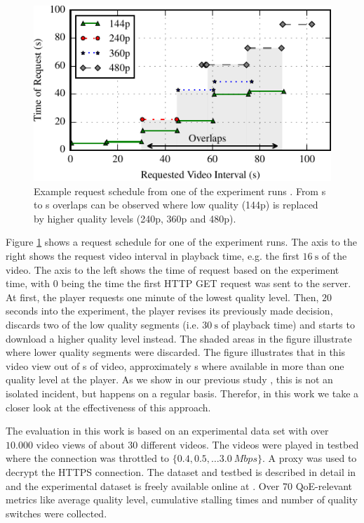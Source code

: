 \begin{figure}[t]
\centering
\includegraphics[width=\columnwidth]{figs/eg_request_schedule}%
\caption{Example request schedule from one of the experiment runs \cite{sieber16sacrificing}. From \unit[30]{s} to \unit[90]{s} overlaps can be observed where low quality (144p) is replaced by higher quality levels (240p, 360p and 480p).}
\label{fig:request_schedule}%
\end{figure}

Figure \ref{fig:request_schedule} shows a request schedule for one of the experiment runs.
The axis to the right shows the request video interval in playback time, e.g. the first $\SI{16}{\second}$ of the video.
The axis to the left shows the time of request based on the experiment time, with $0$ being the time the first HTTP GET request was sent to the server.
At first, the player requests one minute of the lowest quality level.
Then, ${20}$ seconds into the experiment, the player revises its previously made decision, discards two of the low quality segments (i.e. $\SI{30}{\second}$ of playback time) and starts to download a higher quality level instead.
The shaded areas in the figure illustrate where lower quality segments were discarded.
The figure illustrates that in this video view out of \unit[105]{s} of video, approximately \unit[60]{s} where available in more than one quality level at the player. 
As we show in our previous study \cite{sieber16sacrificing}, this is not an isolated incident, but happens on a regular basis. 
Therefor, in this work we take a closer look at the effectiveness of this approach.

The evaluation in this work is based on an experimental data set with over $10.000$ video views of about $30$ different videos.
The videos were played in testbed where the connection was throttled to $\{0.4, 0.5, \dots \SI{3.0}{Mbps}\}$.
A proxy was used to decrypt the HTTPS connection.
The dataset and testbed is described in detail in \cite{sieber16sacrificing,sieber15costaggressive} and the experimental dataset is freely available online at \cite{traces}. 
Over 70 QoE-relevant metrics like average quality level, cumulative stalling times and number of quality switches were collected.

